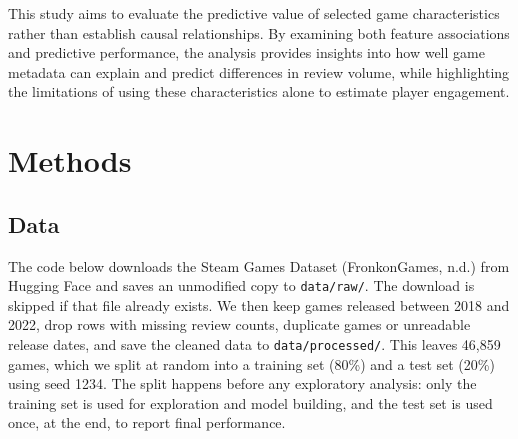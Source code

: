 \documentclass[
  letterpaper,
  DIV=11,
  numbers=noendperiod]{scrartcl}
\begin{document}
This study aims to evaluate the predictive value of selected game
characteristics rather than establish causal relationships. By examining
both feature associations and predictive performance, the analysis
provides insights into how well game metadata can explain and predict
differences in review volume, while highlighting the limitations of
using these characteristics alone to estimate player engagement.

\section{Methods}\label{methods}

\subsection{Data}\label{data}

The code below downloads the Steam Games Dataset (FronkonGames, n.d.)
from Hugging Face and saves an unmodified copy to \texttt{data/raw/}.
The download is skipped if that file already exists. We then keep games
released between 2018 and 2022, drop rows with missing review counts,
duplicate games or unreadable release dates, and save the cleaned data
to \texttt{data/processed/}. This leaves 46,859 games, which we split at
random into a training set (80\%) and a test set (20\%) using seed 1234.
The split happens before any exploratory analysis: only the training set
is used for exploration and model building, and the test set is used
once, at the end, to report final performance.
\end{document}
